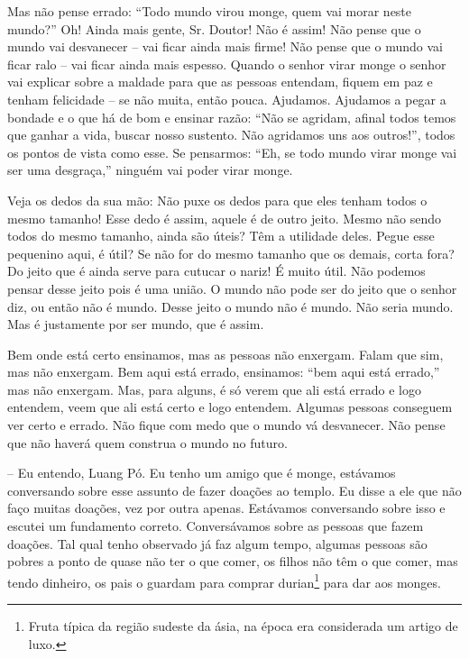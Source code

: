 Mas não pense errado: “Todo mundo virou monge, quem vai morar neste
mundo?” Oh! Ainda mais gente, Sr. Doutor! Não é assim! Não pense que o
mundo vai desvanecer – vai ficar ainda mais firme! Não pense que o
mundo vai ficar ralo – vai ficar ainda mais espesso. Quando o senhor
virar monge o senhor vai explicar sobre a maldade para que as pessoas
entendam, fiquem em paz e tenham felicidade – se não muita, então
pouca. Ajudamos. Ajudamos a pegar a bondade e o que há de bom e ensinar
razão: “Não se agridam, afinal todos temos que ganhar a vida, buscar
nosso sustento. Não agridamos uns aos outros!”, todos os pontos de
vista como esse. Se pensarmos: “Eh, se todo mundo virar monge vai ser
uma desgraça,” ninguém vai poder virar monge. 

Veja os dedos da sua mão: Não puxe os dedos para que eles tenham
todos o mesmo tamanho! Esse dedo é assim, aquele é de outro jeito.
Mesmo não sendo todos do mesmo tamanho, ainda são úteis? Têm a
utilidade deles. Pegue esse pequenino aqui, é útil? Se não for do mesmo
tamanho que os demais, corta fora? Do jeito que é ainda serve para
cutucar o nariz! É muito útil. Não podemos pensar desse jeito pois é
uma união. O mundo não pode ser do jeito que o senhor diz, ou então não
é mundo. Desse jeito o mundo não é mundo. Não seria mundo. Mas é
justamente por ser mundo, que é assim. 

Bem onde está certo ensinamos, mas as pessoas não enxergam. Falam
que sim, mas não enxergam. Bem aqui está errado, ensinamos: “bem aqui
está errado,” mas não enxergam. Mas, para alguns, é só verem que ali
está errado e logo entendem, veem que ali está certo e logo entendem.
Algumas pessoas conseguem ver certo e errado. Não fique com medo que o
mundo vá desvanecer. Não pense que não haverá quem construa o mundo no
futuro.

-- Eu entendo, Luang Pó. Eu tenho um amigo que é monge, estávamos
conversando sobre esse assunto de fazer doações ao templo. Eu disse a
ele que não faço muitas doações, vez por outra apenas. Estávamos
conversando sobre isso e escutei um fundamento correto. Conversávamos
sobre as pessoas que fazem doações. Tal qual tenho observado já faz
algum tempo, algumas pessoas são pobres a ponto de quase não ter o que
comer, os filhos não têm o que comer, mas tendo dinheiro, os pais o
guardam para comprar durian\footnote{Fruta típica da região sudeste da
ásia, na época era considerada um artigo de luxo.} para dar aos monges.

